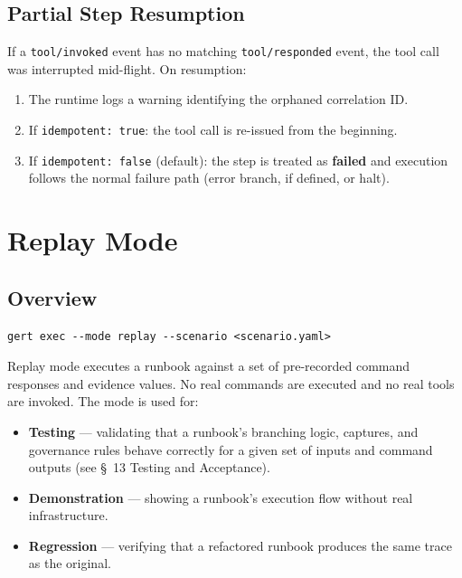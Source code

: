 \subsection{Partial Step Resumption}

If a \texttt{tool/invoked} event has no matching \texttt{tool/responded} event, the tool call was interrupted mid-flight. On resumption:

\begin{enumerate}
  \item The runtime logs a warning identifying the orphaned correlation ID.
  \item If \texttt{idempotent: true}: the tool call is re-issued from the beginning.
  \item If \texttt{idempotent: false} (default): the step is treated as \textbf{failed} and execution follows the normal failure path (error branch, if defined, or halt).
\end{enumerate}

\section{Replay Mode}
\label{sec:replay-mode}

\subsection{Overview}

\begin{verbatim}
gert exec --mode replay --scenario <scenario.yaml>
\end{verbatim}

Replay mode executes a runbook against a set of pre-recorded command responses and evidence values. No real commands are executed and no real tools are invoked. The mode is used for:

\begin{itemize}
  \item \textbf{Testing} — validating that a runbook's branching logic, captures, and governance rules behave correctly for a given set of inputs and command outputs (see \S~13 Testing and Acceptance).
  \item \textbf{Demonstration} — showing a runbook's execution flow without real infrastructure.
  \item \textbf{Regression} — verifying that a refactored runbook produces the same trace as the original.
\end{itemize}


